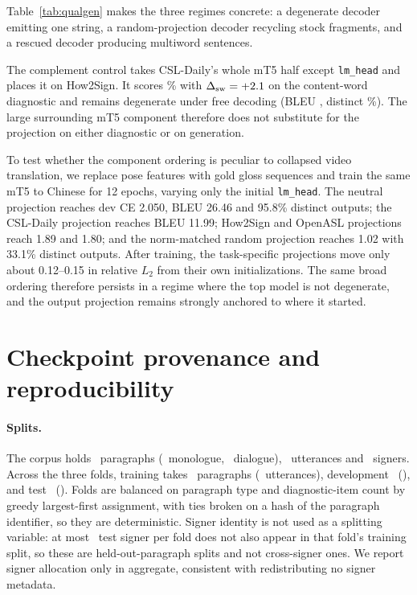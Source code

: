 \documentclass[11pt]{article}
\begin{document}
Table~\ref{tab:qualgen} makes the three regimes concrete: a degenerate decoder
emitting one string, a random-projection decoder recycling stock fragments, and a
rescued decoder producing multiword sentences.

The complement control takes CSL-Daily's whole mT5 half except \texttt{lm\_head}
and places it on How2Sign. It scores \BodyHowCslLexLocal\% with
$\Delta_{\mathrm{sw}}=+2.1$ on the content-word diagnostic and
remains degenerate under free decoding (BLEU \BodyHowCslBleu, distinct
\BodyHowCslUniq\%). The large surrounding mT5 component therefore does not
substitute for the projection on either diagnostic or on generation.

To test whether the component ordering is peculiar to collapsed video
translation, we replace pose features with gold gloss sequences and train the
same mT5 to Chinese for 12 epochs, varying only the initial \texttt{lm\_head}.
The neutral projection reaches dev CE 2.050, BLEU 26.46 and 95.8\% distinct
outputs; the CSL-Daily projection reaches BLEU 11.99; How2Sign and OpenASL
projections reach 1.89 and 1.80; and the norm-matched random projection reaches
1.02 with 33.1\% distinct outputs. After training, the task-specific projections
move only about 0.12--0.15 in relative $L_2$ from their own initializations. The
same broad ordering therefore persists in a regime where the top model is not
degenerate, and the output projection remains strongly anchored to where it
started.

\section{Checkpoint provenance and reproducibility}
\label{sec:repro}

\paragraph{Splits.}
The corpus holds \SplitParagraphs\ paragraphs (\SplitMonoParas\ monologue,
\SplitDialogueParas\ dialogue), \SplitUtterances\ utterances and \SplitSigners\
signers. Across the three folds, training takes \SplitTrainParas\ paragraphs
(\SplitTrainUtts\ utterances), development \SplitDevParas\ (\SplitDevUtts), and
test \SplitTestParas\ (\SplitTestUtts). Folds are balanced on paragraph type and
diagnostic-item count by greedy largest-first assignment, with ties broken on a
hash of the paragraph identifier, so they are deterministic. Signer identity is
not used as a splitting variable: at most \SplitTestSignersUnseen\ test signer
per fold does not also appear in that fold's training split, so these are
held-out-paragraph splits and not cross-signer ones. We report signer allocation
only in aggregate, consistent with redistributing no signer metadata.
\end{document}
